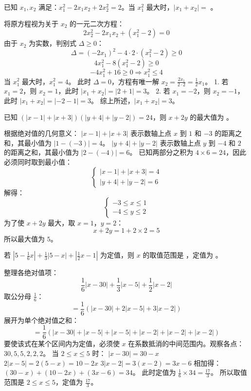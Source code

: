 \begin{questions}
    \question 已知 $x_1, x_2$ 满足：$x_1^2 - 2x_1x_2 + 2x_2^2 = 2$。当 $x_1^2$ 最大时，$|x_1 + x_2| =$ \underline{\hspace{1cm}}。

\begin{solution}
将原方程视为关于 $x_2$ 的一元二次方程：
\[
2x_2^2 - 2x_1x_2 + (x_1^2 - 2) = 0
\]
由于 $x_2$ 为实数，判别式 $\Delta \ge 0$：
\[
\Delta = (-2x_1)^2 - 4 \cdot 2 \cdot (x_1^2 - 2) \ge 0
\]
\[
4x_1^2 - 8(x_1^2 - 2) \ge 0
\]
\[
-4x_1^2 + 16 \ge 0 \Rightarrow x_1^2 \le 4
\]
当 $x_1^2$ 最大时，$x_1^2 = 4$。
此时 $\Delta = 0$，方程有唯一解 $x_2 = \frac{2x_1}{2 \cdot 2} = \frac{1}{2}x_1$。
1. 若 $x_1 = 2$，则 $x_2 = 1$，此时 $|x_1 + x_2| = |2 + 1| = 3$。
2. 若 $x_1 = -2$，则 $x_2 = -1$，此时 $|x_1 + x_2| = |-2 - 1| = 3$。
综上所述，$|x_1 + x_2| = 3$。
\end{solution}

\question 已知 $(|x - 1| + |x + 3|)(|y + 4| + |y - 2|) = 24$，则 $x + 2y$ 的最大值为 \underline{\hspace{1cm}}。

\begin{solution}
根据绝对值的几何意义：
$|x - 1| + |x + 3|$ 表示数轴上点 $x$ 到 $1$ 和 $-3$ 的距离之和，其最小值为 $|1 - (-3)| = 4$。
$|y + 4| + |y - 2|$ 表示数轴上点 $y$ 到 $-4$ 和 $2$ 的距离之和，其最小值为 $|2 - (-4)| = 6$。
已知两部分之积为 $4 \times 6 = 24$，因此必须同时取到最小值：
\[
\begin{cases} |x - 1| + |x + 3| = 4 \\ |y + 4| + |y - 2| = 6 \end{cases}
\]
解得：
\[
\begin{cases} -3 \le x \le 1 \\ -4 \le y \le 2 \end{cases}
\]
为了使 $x + 2y$ 最大，取 $x = 1$，$y = 2$：
\[
x + 2y = 1 + 2 \times 2 = 5
\]
所以最大值为 $5$。
\end{solution}

\question 若 $\left| 5 - \frac{1}{6}x \right| + \frac{1}{3}|5 - x| + \left| \frac{1}{2}x - 1 \right|$ 为定值，则 $x$ 的取值范围是 \underline{\hspace{1cm}}，定值为 \underline{\hspace{1cm}}。

\begin{solution}
整理各绝对值项：
\[
\frac{1}{6}|x - 30| + \frac{1}{3}|x - 5| + \frac{1}{2}|x - 2|
\]
取公分母 $\frac{1}{6}$：
\[
= \frac{1}{6} \left( |x - 30| + 2|x - 5| + 3|x - 2| \right)
\]
展开为单个绝对值之和：
\[
= \frac{1}{6} \left( |x - 30| + |x - 5| + |x - 5| + |x - 2| + |x - 2| + |x - 2| \right)
\]
要使该式在某个区间内为定值，必须使 $x$ 在系数抵消的中间范围内。观察各点：$30, 5, 5, 2, 2, 2$。
当 $2 \le x \le 5$ 时：
$|x - 30| = 30 - x$
$2|x - 5| = 2(5 - x) = 10 - 2x$
$3|x - 2| = 3(x - 2) = 3x - 6$
相加得：$(30 - x) + (10 - 2x) + (3x - 6) = 34$。
此时定值为 $\frac{1}{6} \times 34 = \frac{17}{3}$。
所以取值范围是 $2 \le x \le 5$，定值为 $\frac{17}{3}$。
\end{solution}


\end{questions}

